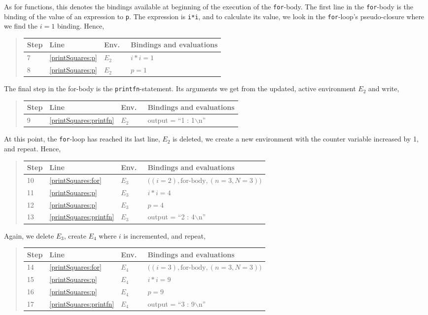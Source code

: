 \documentclass[fsharpNotes.tex]{subfiles}
\begin{document}
As for functions, this denotes the bindings available at beginning of the execution of the \lstinline{for}-body. The first line in the \lstinline{for}-body is the binding of the value of an expression to \lstinline{p}. The expression is \lstinline{i*i}, and to calculate its value, we look in the \lstinline{for}-loop's pseudo-closure where we find the $i=1$ binding. Hence,
\begin{quote}
  \begin{tabular*}{0.9\linewidth}{l|lll}
    Step & Line & Env.\ & Bindings and evaluations\\
    \hline
    7 &\ref{printSquares:p} & $E_2$ & $i*i = 1$\\
    8 &\ref{printSquares:p} & $E_2$ & $p = 1$\\
  \end{tabular*}
\end{quote}
The final step in the for-body is the \lstinline{printfn}-statement. Its arguments we get from the updated, active environment $E_2$ and write,
\begin{quote}
\begin{tabular*}{0.9\linewidth}{l|lll}
    Step & Line & Env.\ & Bindings and evaluations\\
    \hline
    9 &\ref{printSquares:printfn} & $E_2$ & output = ``1 : 1$\backslash$n''\\
  \end{tabular*}
\end{quote}
At this point, the \lstinline{for}-loop has reached its last line, $E_2$ is deleted, we create a new environment with the counter variable increased by 1, and repeat. Hence,
\begin{quote}
  \begin{tabular*}{0.9\linewidth}{l|lll}
    Step & Line & Env.\ & Bindings and evaluations\\
    \hline
    10 &\ref{printSquares:for} & $E_3$ & $\big((i=2), \text{for-body}, (n=3,N=3)\big)$\\
    11 &\ref{printSquares:p} & $E_3$ & $i*i = 4$\\
    12 &\ref{printSquares:p} & $E_3$ & $p = 4$\\
    13 &\ref{printSquares:printfn} & $E_3$ & output = ``2 : 4$\backslash$n''\\
  \end{tabular*}
\end{quote}
Again, we delete $E_3$, create $E_4$ where $i$ is incremented, and repeat, 
\begin{quote}
  \begin{tabular*}{0.9\linewidth}{l|lll}
    Step & Line & Env.\ & Bindings and evaluations\\
    \hline
    14 &\ref{printSquares:for} & $E_4$ & $\big((i=3), \text{for-body}, (n=3,N=3)\big)$\\
    15 &\ref{printSquares:p} & $E_4$ & $i*i = 9$\\
    16 &\ref{printSquares:p} & $E_4$ & $p = 9$\\
    17 &\ref{printSquares:printfn} & $E_4$ & output = ``3 : 9$\backslash$n''\\
  \end{tabular*}
\end{quote}
\end{document}
